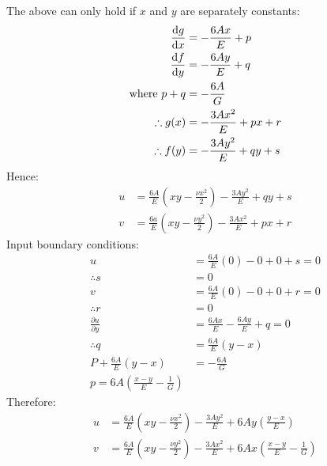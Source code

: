 The above can only hold if $x$ and $y$ are separately constants:
\begin{align}
    \frac{\dif g}{\dif x} & = -\frac{6Ax}{E} + p        \\
    \frac{\dif f}{\dif y} & = -\frac{6Ay}{E} + q        \\
    \textrm{where } p+q   & = -\frac{6A}{G}             \\
    \therefore g(x)       & = -\frac{3Ax^2}{E} + px + r \\
    \therefore f(y)       & = -\frac{3Ay^2}{E} + qy + s
\end{align}
Hence:
\begin{align}
    u & = \frac{6A}{E}\left(xy - \frac{\nu x^2}{2}\right)-\frac{3Ay^2}{E} + qy +s  \\
    v & = \frac{6a}{E}\left(xy - \frac{\nu y^2}{2}\right)-\frac{3Ax^2}{E} + px + r
\end{align}
Input boundary conditions:
\begin{align}
    u                                  & = \frac{6A}{E} \left(0\right) - 0 + 0+ s= 0 \\
    \therefore s                       & = 0                                         \\
    v                                  & = \frac{6A}{E} \left(0\right) - 0 + 0+ r= 0 \\
    \therefore r                       & = 0                                         \\
    \frac{\partial u}{\partial y}      & = \frac{6Ax}{E} - \frac{6Ay}{E} + q = 0     \\
    \therefore q                       & = \frac{6A}{E}\left(y - x\right)            \\
    P + \frac{6A}{E}\left(y - x\right) & = - \frac{6A}{G}                            \\
    p = 6A\left(\frac{x-y}{E}-\frac{1}{G}\right)
\end{align}
Therefore:
\begin{align}
    u & = \frac{6A}{E}\left(xy-\frac{\nu x^2}{2}\right) - \frac{3Ay^2}{E} + 6Ay\left(\frac{y-x}{E}\right)             \\
    v & = \frac{6A}{E}\left(xy-\frac{\nu y^2}{2}\right) - \frac{3Ax^2}{E} + 6Ax\left(\frac{x-y}{E}-\frac{1}{G}\right)
\end{align}

